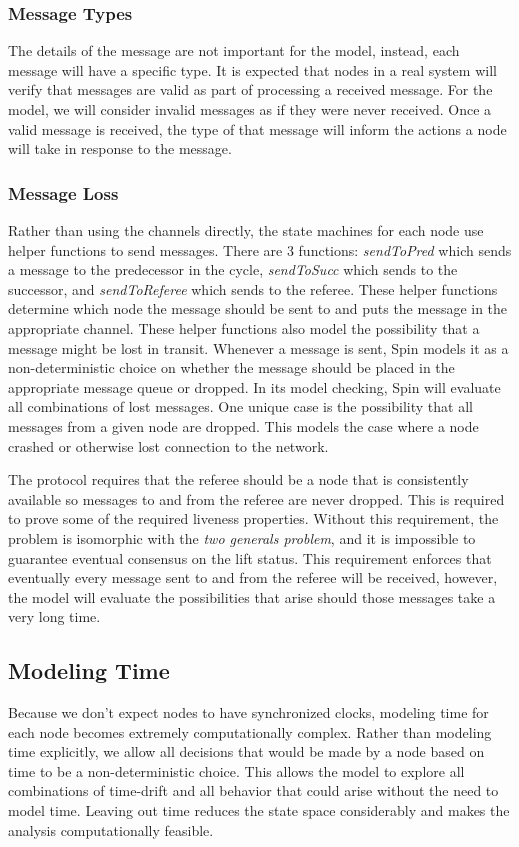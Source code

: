 \documentclass[runningheads]{llncs}
\begin{document}
\subsubsection{Message Types}
The details of the message are not important for the model, instead, each message will have a specific type. It is expected that nodes in a real system will verify that messages are valid as part of processing a received message. For the model, we will consider invalid messages as if they were never received. Once a valid message is received, the type of that message will inform the actions a node will take in response to the message.

\subsubsection{Message Loss}
Rather than using the channels directly, the state machines for each node use helper functions to send messages. There are 3 functions: \emph{sendToPred} which sends a message to the predecessor in the cycle, \emph{sendToSucc} which sends to the successor, and \emph{sendToReferee} which sends to the referee. These helper functions determine which node the message should be sent to and puts the message in the appropriate channel. These helper functions also model the possibility that a message might be lost in transit. Whenever a message is sent, Spin models it as a non-deterministic choice on whether the message should be placed in the appropriate message queue or dropped. In its model checking, Spin will evaluate all combinations of lost messages. One unique case is the possibility that all messages from a given node are dropped. This models the case where a node crashed or otherwise lost connection to the network. 

The protocol requires that the referee should be a node that is consistently available so messages to and from the referee are never dropped. This is required to prove some of the required liveness properties. Without this requirement, the problem is isomorphic with the \emph{two generals problem}, and it is impossible to guarantee eventual consensus on the lift status. This requirement enforces that eventually every message sent to and from the referee will be received, however, the model will evaluate the possibilities that arise should those messages take a very long time. 

\subsection{Modeling Time}
\label{sec:model_time}
Because we don't expect nodes to have synchronized clocks, modeling time for each node becomes extremely computationally complex. Rather than modeling time explicitly, we allow all decisions that would be made by a node based on time to be a non-deterministic choice. This allows the model to explore all combinations of time-drift and all behavior that could arise without the need to model time. Leaving out time reduces the state space considerably and makes the analysis computationally feasible. 
\end{document}
